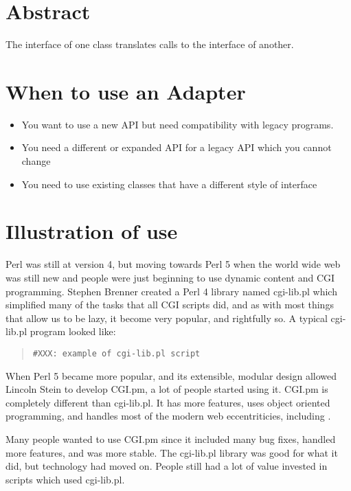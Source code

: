 
    \section{Abstract}

The interface of one class translates calls to the interface
of another.

    \section{When to use an Adapter}
    
\begin{itemize}
\item You want to use a new API but need compatibility with
    legacy programs.
\item You need a different or expanded API for a legacy API
    which you cannot change
\item You need to use existing classes that have a different
    style of interface
\end{itemize}

	\section{Illustration of use}
	
Perl was still at version 4, but moving towards Perl 5 when the world
wide web was still new and people were just beginning to use dynamic
content and CGI programming.  Stephen Brenner created a Perl 4 library
named cgi-lib.pl which simplified many of the tasks that all CGI scripts
did, and as with most things that allow us to be lazy, it become very
popular, and rightfully so.  A typical cgi-lib.pl program looked like:

\begin{quote}
\begin{verbatim}
#XXX: example of cgi-lib.pl script
\end{verbatim}
\end{quote}

When Perl 5 became more popular, and its extensible, modular design
allowed Lincoln Stein to develop CGI.pm, a lot of people started using
it.  CGI.pm is completely different than cgi-lib.pl.  It has more
features, uses object oriented programming, and handles most of the
modern web eccentriticies, including \modperl.

Many people wanted to use CGI.pm since it included many bug fixes, handled
more features, and was more stable.  The cgi-lib.pl library was good
for what it did, but technology had moved on. People still had a lot
of value invested in scripts which used cgi-lib.pl.

